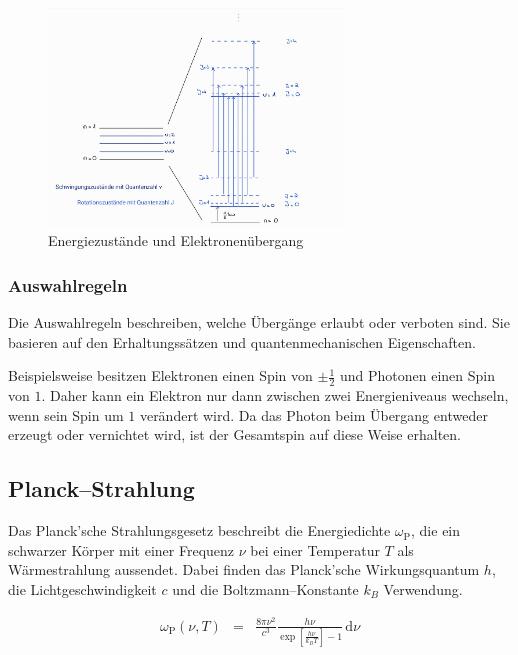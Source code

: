 \documentclass[12pt,a4paper]{scrartcl}
\numberwithin{equation}{section} %
\begin{document}
\begin{figure}[h!]
  \centering
  \includegraphics[width=0.7\textwidth]{../media/B1.1/Uebergaenge.jpg}
  \caption{Energiezustände und Elektronenübergang \cite{Agilent Technologies}}
  \label{abb:Übergänge}
\end{figure}

\subsubsection{Auswahlregeln}
Die Auswahlregeln beschreiben, welche Übergänge erlaubt oder verboten sind. Sie basieren auf den Erhaltungssätzen und quantenmechanischen Eigenschaften.

Beispielsweise besitzen Elektronen einen Spin von $\pm\frac{1}{2}$ und Photonen einen Spin von $1$. Daher kann ein Elektron nur dann zwischen zwei Energieniveaus wechseln, wenn sein Spin um $1$ verändert wird. Da das Photon beim Übergang entweder erzeugt oder vernichtet wird, ist der Gesamtspin auf diese Weise erhalten.

\hypertarget{planckstrahlung}{%
\subsection{Planck--Strahlung}\label{planckstrahlung}}

Das Planck'sche Strahlungsgesetz beschreibt die Energiedichte $\omega_\mathrm{P}$, die ein schwarzer Körper mit einer Frequenz $\nu$ bei einer Temperatur $T$ als Wärmestrahlung aussendet. Dabei finden das Planck'sche Wirkungsquantum $h$, die Lichtgeschwindigkeit $c$ und die Boltzmann--Konstante $k_B$ Verwendung. \cite{Demtröder Atom}

\begin{eqnarray}
  \omega_\mathrm{P}(\nu,T) &=&
  \frac{8\pi\nu^2}{c^3}
  \frac{h\nu}{\exp\left[\frac{h\nu}{k_BT}\right]-1}
  \,\mathrm d\nu
  \label{eq:PlackStrahlung}
\end{eqnarray}
\end{document}
